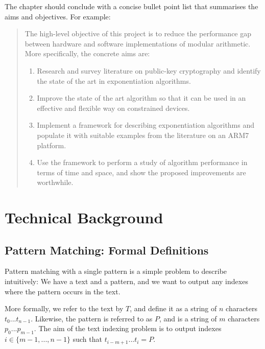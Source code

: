 \documentclass[ %
                    author={Dominic Joseph Moylett},
                    degree={MEng},
                     title={Dictionary Matching with Fingerprints},
                  subtitle={An Empirical Analysis},
                      type={research},
                      year={2015} ]{dissertation}
\begin{document}
The chapter should conclude with a concise bullet point list that 
summarises the aims and objectives.  For example:

\begin{quote}
\noindent
The high-level objective of this project is to reduce the performance 
gap between hardware and software implementations of modular arithmetic.  
More specifically, the concrete aims are:

\begin{enumerate}
\item Research and survey literature on public-key cryptography and
      identify the state of the art in exponentiation algorithms.
\item Improve the state of the art algorithm so that it can be used
      in an effective and flexible way on constrained devices.
\item Implement a framework for describing exponentiation algorithms
      and populate it with suitable examples from the literature on 
      an ARM7 platform.
\item Use the framework to perform a study of algorithm performance
      in terms of time and space, and show the proposed improvements
      are worthwhile.
\end{enumerate}
\end{quote}


\chapter{Technical Background}
\label{chap:technical}

\section{Pattern Matching: Formal Definitions}

Pattern matching with a single pattern is a simple problem to describe intuitively: We have a text and a pattern, and we want to output any indexes where the pattern occurs in the text.

More formally, we refer to the text by $T$, and define it as a string of $n$ characters $t_0...t_{n-1}$. Likewise, the pattern is referred to as $P$, and is a string of $m$ characters $p_0...p_{m-1}$. The aim of the text indexing problem is to output indexes $i \in \{m-1,...,n-1\}$ such that $t_{i-m+1}...t_{i} = P$.
\end{document}
